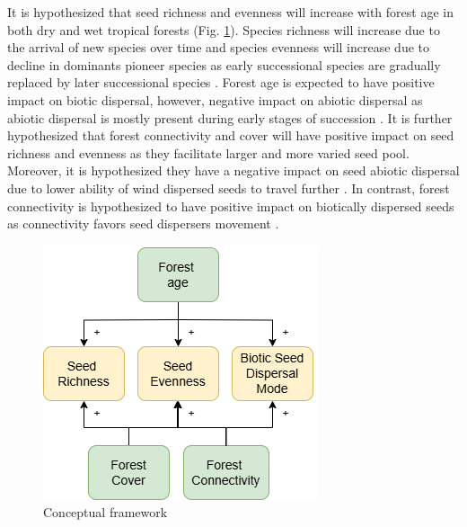 It is hypothesized that seed richness and evenness will increase with forest age in both dry and wet tropical forests (Fig. \ref{fig:cf}). Species richness will increase due to the arrival of new species over time and species evenness will increase due to decline in dominants pioneer species as early successional species are gradually replaced by later successional species \citep{poorterSuccessionalTheories2023, chazdonNaturalRegenerationTool2016}. Forest age is expected to have positive impact on biotic dispersal, however, negative impact on abiotic dispersal as abiotic dispersal is mostly present during early stages of succession \citep{dentUnitingNicheDifferentiation2021}. It is further hypothesized that forest connectivity and cover will have positive impact on seed richness and evenness as they facilitate larger and more varied seed pool. Moreover, it is hypothesized they have a negative impact on seed abiotic dispersal due to lower ability of wind dispersed seeds to travel further \citep{vieiraPrinciplesNaturalRegeneration2006}. In contrast, forest connectivity is hypothesized to have positive impact on biotically dispersed seeds as connectivity favors seed dispersers movement \citep{dentUnitingNicheDifferentiation2021}. 



\begin{figure}[]
\begin{center}
		\includegraphics[]{Proposal/graphics/contextual_framework.drawio.png}
	\caption{Conceptual framework}
\label{fig:cf}
\end{center}
\end{figure}